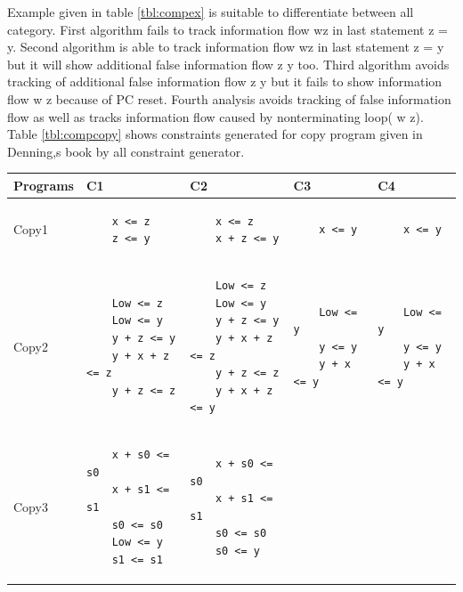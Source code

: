 Example given in table \ref{tbl:compex} is suitable to differentiate between all category.
First algorithm fails to track information flow w\marr z in last statement z = y.
Second algorithm is able to track information flow w\marr z in last statement z = y but it will show additional false information flow z \marr y too. 
Third algorithm avoids tracking of additional false information flow z \marr y but it fails to show information flow w \marr z because of PC reset.
Fourth analysis avoids tracking of false information flow as well as tracks information flow caused by nonterminating loop( w \marr z). Table \ref{tbl:compcopy} shows constraints generated for copy program given in Denning,s book by all constraint generator.
\begin{table}
\hspace{-2cm}
\begin{tabular}{|l|l|l|l|l|}
	\hline
	Programs  &  C1 & C2 & C3 & C4 \\
	\hline
	Copy1&
	\begin{lstlisting}
	x <= z
	z <= y
	\end{lstlisting}&
	\begin{lstlisting}
	x <= z
	x + z <= y
	\end{lstlisting}&
	\begin{lstlisting}
	x <= y
	\end{lstlisting}&
	\begin{lstlisting}
	x <= y
	\end{lstlisting}\\
	\hline
	Copy2&
	\begin{lstlisting}
	Low <= z
	Low <= y
	y + z <= y
	y + x + z <= z
	y + z <= z
	\end{lstlisting}&
	\begin{lstlisting}
	Low <= z
	Low <= y
	y + z <= y
	y + x + z <= z
	y + z <= z
	y + x + z <= y
	\end{lstlisting}&
	\begin{lstlisting}
	Low <= y
	y <= y
	y + x <= y
	\end{lstlisting}&
	\begin{lstlisting}
	Low <= y
	y <= y
	y + x <= y
	\end{lstlisting}
	\\
	\hline
	Copy3&
	\begin{lstlisting}
	x + s0 <= s0
	x + s1 <= s1
	s0 <= s0
	Low <= y
	s1 <= s1
	\end{lstlisting}&
	\begin{lstlisting}
	x + s0 <= s0
	x + s1 <= s1
	s0 <= s0
	s0 <= y

\end{lstlisting}
\end{tabular}
\end{table}
